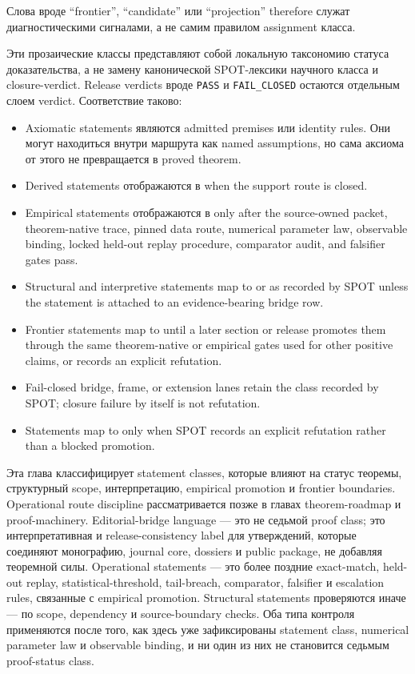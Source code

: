 Слова вроде ``frontier'', ``candidate'' или ``projection'' therefore
служат диагностическими сигналами, а не самим правилом assignment класса.

Эти прозаические классы представляют собой локальную таксономию статуса
доказательства, а не замену канонической SPOT-лексики научного класса и
closure-verdict. Release verdicts вроде \texttt{PASS} и
\texttt{FAIL\_CLOSED} остаются отдельным слоем verdict. Соответствие таково:
\begin{itemize}
\item Axiomatic statements являются admitted premises или identity rules. Они
      могут находиться внутри маршрута  как named
      assumptions, но сама аксиома от этого не превращается в proved theorem.
\item Derived statements отображаются в  when the
      support route is closed.
\item Empirical statements отображаются в  only after
      the source-owned packet, theorem-native trace, pinned data route,
      numerical parameter law, observable binding, locked held-out replay
      procedure, comparator audit, and falsifier gates pass.
\item Structural and interpretive statements map to  or
       as recorded by SPOT unless the statement is attached
      to an evidence-bearing bridge row.
\item Frontier statements map to  until a later section or
      release promotes them through the same theorem-native or empirical gates
      used for other positive claims, or records an explicit refutation.
\item Fail-closed bridge, frame, or extension lanes retain the class recorded
      by SPOT; closure failure by itself is not refutation.
\item Statements map to  only when SPOT records an explicit
      refutation rather than a blocked promotion.
\end{itemize}
Эта глава классифицирует statement classes, которые влияют на статус
теоремы, структурный scope, интерпретацию, empirical promotion и
frontier boundaries.
Operational route discipline рассматривается позже в главах theorem-roadmap и
proof-machinery.
Editorial-bridge language — это не седьмой proof class; это
интерпретативная и release-consistency label для утверждений, которые
соединяют монографию, journal core, dossiers и public package, не добавляя
теоремной силы.
Operational statements — это более поздние exact-match, held-out replay,
statistical-threshold, tail-breach, comparator, falsifier и escalation rules,
связанные с empirical promotion. Structural statements проверяются иначе — по
scope, dependency и source-boundary checks. Оба типа контроля применяются
после того, как здесь уже зафиксированы statement class, numerical parameter
law и observable binding, и ни один из них не становится седьмым proof-status
class.

